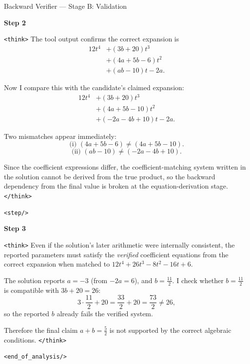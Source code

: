 \documentclass[11pt]{article}
\begin{document}
\begin{exbox}{Backward Verifier — Stage B: Validation}

\textbf{Step 2}

\texttt{<think>}
The tool output confirms the correct expansion is
\[
\begin{aligned}
12t^4
&+ (3b+20)t^3 \\
&+ (4a+5b-6)t^2 \\
&+ (ab-10)t - 2a.
\end{aligned}
\]

Now I compare this with the candidate’s claimed expansion:
\[
\begin{aligned}
12t^4
&+ (3b+20)t^3 \\
&+ (4a+5b-10)t^2 \\
&+ (-2a-4b+10)t - 2a.
\end{aligned}
\]

Two mismatches appear immediately:
\[
\text{(i) } (4a+5b-6)\neq(4a+5b-10).
\]
\[
\text{(ii) } (ab-10)\neq(-2a-4b+10).
\]

Since the coefficient expressions differ, the coefficient-matching system
written in the solution cannot be derived from the true product, so the
backward dependency from the final value is broken at the equation-derivation
stage.
\texttt{</think>}

\texttt{<step/>}

\textbf{Step 3}

\texttt{<think>}
Even if the solution’s later arithmetic were internally consistent, the
reported parameters must satisfy the \emph{verified} coefficient equations
from the correct expansion when matched to
$12t^4+26t^3-8t^2-16t+6$.

The solution reports $a=-3$ (from $-2a=6$), and $b=\frac{11}{2}$.
I check whether $b=\frac{11}{2}$ is compatible with $3b+20=26$:
\[
3\cdot\frac{11}{2}+20=\frac{33}{2}+20=\frac{73}{2}\neq 26,
\]
so the reported $b$ already fails the verified system.

Therefore the final claim $a+b=\frac{5}{2}$ is not supported by the correct
algebraic conditions.
\texttt{</think>}

\texttt{<end\_of\_analysis/>}
\end{exbox}
\end{document}
